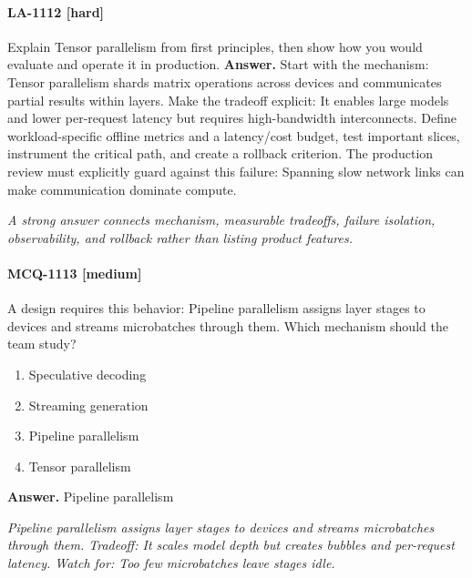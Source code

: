 \paragraph{LA-1112 [hard]} Explain Tensor parallelism from first principles, then show how you would evaluate and operate it in production.
\noindent\textbf{Answer.} Start with the mechanism: Tensor parallelism shards matrix operations across devices and communicates partial results within layers. Make the tradeoff explicit: It enables large models and lower per-request latency but requires high-bandwidth interconnects. Define workload-specific offline metrics and a latency/cost budget, test important slices, instrument the critical path, and create a rollback criterion. The production review must explicitly guard against this failure: Spanning slow network links can make communication dominate compute.
\par\textit{A strong answer connects mechanism, measurable tradeoffs, failure isolation, observability, and rollback rather than listing product features.}
\paragraph{MCQ-1113 [medium]} A design requires this behavior: Pipeline parallelism assigns layer stages to devices and streams microbatches through them. Which mechanism should the team study?
\begin{enumerate}[label=\Alph*.]
\item Speculative decoding
\item Streaming generation
\item Pipeline parallelism
\item Tensor parallelism
\end{enumerate}
\noindent\textbf{Answer.} Pipeline parallelism
\par\textit{Pipeline parallelism assigns layer stages to devices and streams microbatches through them. Tradeoff: It scales model depth but creates bubbles and per-request latency. Watch for: Too few microbatches leave stages idle.}
